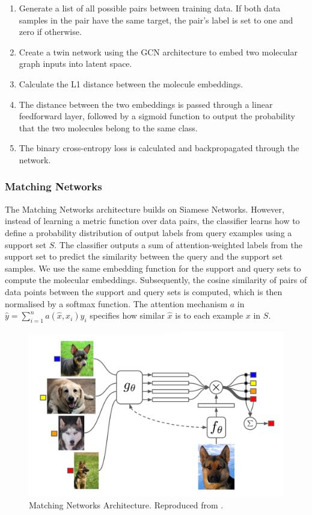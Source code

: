 \begin{enumerate}
    \item Generate a list of all possible pairs between training data. If both data samples in the pair have the same target, the pair's label is set to one and zero if otherwise.
    \item Create a twin network using the GCN architecture to embed two molecular graph inputs into latent space.
    \item Calculate the L1 distance between the molecule embeddings. 
    \item The distance between the two embeddings is passed through a linear feedforward layer, followed by a sigmoid function to output the probability that the two molecules belong to the same class.
    \item The binary cross-entropy loss is calculated and backpropagated through the network.
\end{enumerate}

\subsubsection{Matching Networks}

The Matching Networks architecture builds on Siamese Networks. However, instead of learning a metric function over data pairs, the classifier learns how to define a probability distribution of output labels from query examples using a support set $S$. The classifier outputs a sum of attention-weighted labels from the support set to predict the similarity between the query and the support set samples. We use the same embedding function for the support and query sets to compute the molecular embeddings. Subsequently, the cosine similarity of pairs of data points between the support and query sets is computed, which is then normalised by a softmax function. The attention mechanism $a$ in $\hat{y} = \sum_{i=1}^{n} a(\hat{x}, x_i)y_i$ specifies how similar $\hat{x}$ is to each example $x$ in $S$.

\begin{figure}[!ht]
    \centering
    \includegraphics[width=0.7\linewidth]{img/matching_networks.png}
    \caption[Matching Networks Architecture]{Matching Networks Architecture. Reproduced from \citet{vinyals2016matching}.}
    \label{fig:matchingnets}
\end{figure}

